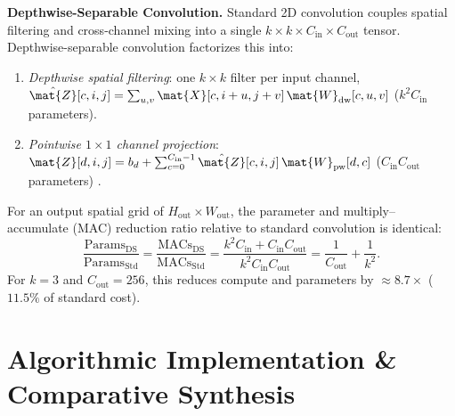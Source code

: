 \documentclass[../../../../master.tex]{subfiles}
\begin{document}
\begin{coremath}
\textbf{Depthwise-Separable Convolution.} Standard 2D convolution couples spatial filtering and cross-channel mixing into a single $k \times k \times C_{\mathrm{in}} \times C_{\mathrm{out}}$ tensor. Depthwise-separable convolution  factorizes this into:
\begin{enumerate}
  \item \emph{Depthwise spatial filtering}: one $k \times k$ filter per input channel, $\hat{\mat{Z}}[c, i, j] = \sum_{u,v} \mat{X}[c, i+u, j+v]\, \mat{W}_{\mathrm{dw}}[c, u, v]$ ($k^2 C_{\mathrm{in}}$ parameters).
  \item \emph{Pointwise $1 \times 1$ channel projection}: $\mat{Z}[d, i, j] = b_d + \sum_{c=0}^{C_{\mathrm{in}}-1} \hat{\mat{Z}}[c, i, j]\, \mat{W}_{\mathrm{pw}}[d, c]$ ($C_{\mathrm{in}} C_{\mathrm{out}}$ parameters) .
\end{enumerate}
For an output spatial grid of $H_{\mathrm{out}} \times W_{\mathrm{out}}$, the parameter and multiply--accumulate (MAC) reduction ratio relative to standard convolution is identical:
\begin{equation}
\label{eq:cnn:ds_ratio}
\frac{\mathrm{Params}_{\mathrm{DS}}}{\mathrm{Params}_{\mathrm{Std}}}
= \frac{\mathrm{MACs}_{\mathrm{DS}}}{\mathrm{MACs}_{\mathrm{Std}}}
= \frac{k^2 C_{\mathrm{in}} + C_{\mathrm{in}} C_{\mathrm{out}}}{k^2 C_{\mathrm{in}} C_{\mathrm{out}}}
= \frac{1}{C_{\mathrm{out}}} + \frac{1}{k^2}.
\end{equation}
For $k = 3$ and $C_{\mathrm{out}} = 256$, this reduces compute and parameters by $\approx 8.7\times$ ($11.5\%$ of standard cost).
\end{coremath}


\section{Algorithmic Implementation \& Comparative Synthesis}
\label{sec:cnn:algorithms}
\end{document}
